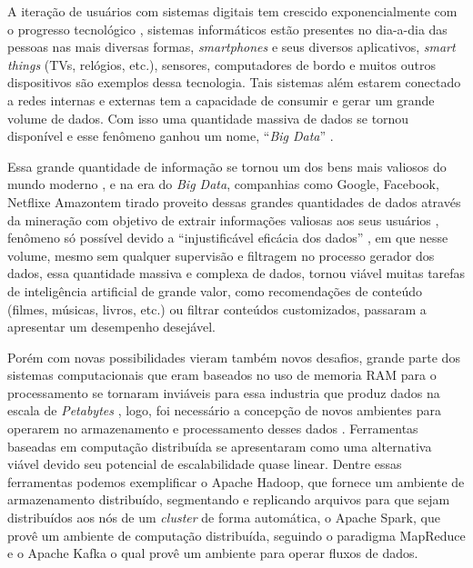 A iteração de usuários com sistemas digitais tem crescido exponencialmente com
o progresso tecnológico \cite{dean2008mapreduce,atzori2010internet}, sistemas
informáticos estão presentes no dia-a-dia das pessoas nas mais diversas formas,
\textit{smartphones} e seus diversos aplicativos, \textit{smart things} (TVs,
relógios, etc.), sensores, computadores de bordo e muitos outros dispositivos
são exemplos dessa tecnologia. Tais sistemas além estarem conectado a redes
internas e externas tem a capacidade de consumir e gerar um grande volume de
dados. Com isso uma quantidade massiva de dados se tornou disponível e esse
fenômeno ganhou um nome, ``\textit{Big Data}'' \cite{mcafee2012big}.

Essa grande quantidade de informação se tornou um dos bens mais valiosos do
mundo moderno \cite{economist2017world}, e na era do \textit{Big Data},
companhias como Google\regsymbol, Facebook\regsymbol, Netflix\regsymbol e
Amazon\regsymbol tem tirado proveito dessas grandes quantidades de dados
através da mineração com objetivo de extrair informações valiosas aos seus
usuários \cite{tarnoff2018big, finger2014data}, fenômeno só possível devido a
``injustificável eficácia dos dados'' \cite{halevy2009unreasonable}, em que
nesse volume, mesmo sem qualquer supervisão e filtragem no processo gerador dos
dados, essa quantidade massiva e complexa de dados, tornou viável muitas
tarefas de inteligência artificial de grande valor, como recomendações de
conteúdo (filmes, músicas, livros, etc.) ou filtrar conteúdos customizados,
passaram a apresentar um desempenho desejável.

Porém com novas possibilidades vieram também novos desafios, grande parte dos
sistemas computacionais que eram baseados no uso de memoria RAM para o
processamento se tornaram inviáveis para essa industria que produz dados na
escala de \textit{Petabytes} \cite{dean2008mapreduce}, logo, foi necessário a
concepção de novos ambientes para operarem no armazenamento e processamento
desses dados \cite{gama2007learning}. Ferramentas baseadas em computação
distribuída se apresentaram como uma alternativa viável devido seu potencial de
escalabilidade quase linear. Dentre essas ferramentas podemos exemplificar o
Apache Hadoop\textsuperscript{\tiny\textregistered}, que fornece um ambiente de
armazenamento distribuído, segmentando e replicando arquivos para que sejam
distribuídos aos nós de um \textit{cluster} de forma automática, o Apache
Spark\textsuperscript{\tiny\textregistered}, que provê um ambiente de
computação distribuída, seguindo o paradigma MapReduce e o Apache
Kafka\textsuperscript{\tiny\textregistered} o qual provê um ambiente para
operar fluxos de dados.


